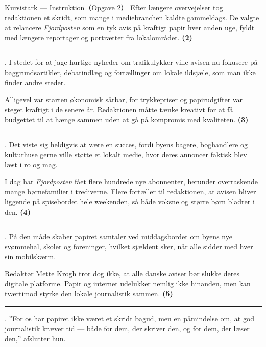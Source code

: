 \begin{emailbox}{Kursistark --- Instruktion（Opgave 2）}
\vspace{0.25em}
Efter længere overvejelser tog redaktionen et skridt, som mange i mediebranchen kaldte gammeldags. De valgte at relancere \textit{Fjordposten} som en tyk avis på kraftigt papir hver anden uge, fyldt med længere reportager og portrætter fra lokalområdet. \textbf{(2)}\ \rule{1.8cm}{0.4pt}. I stedet for at jage hurtige nyheder om trafikulykker ville avisen nu fokusere på baggrundsartikler, debatindlæg og fortællinger om lokale ildsjæle, som man ikke finder andre steder.

\vspace{0.25em}
Alligevel var starten økonomisk sårbar, for trykkepriser og papirudgifter var steget kraftigt i de senere år. Redaktionen måtte tænke kreativt for at få budgettet til at hænge sammen uden at gå på kompromis med kvaliteten. \textbf{(3)}\ \rule{1.8cm}{0.4pt}. Det viste sig heldigvis at være en succes, fordi byens bagere, boghandlere og kulturhuse gerne ville støtte et lokalt medie, hvor deres annoncer faktisk blev læst i ro og mag.

\vspace{0.25em}
I dag har \textit{Fjordposten} fået flere hundrede nye abonnenter, herunder overraskende mange børnefamilier i trediverne. Flere fortæller til redaktionen, at avisen bliver liggende på spisebordet hele weekenden, så både voksne og større børn bladrer i den. \textbf{(4)}\ \rule{1.8cm}{0.4pt}. På den måde skaber papiret samtaler ved middagsbordet om byens nye svømmehal, skoler og foreninger, hvilket sjældent sker, når alle sidder med hver sin mobilskærm.

\vspace{0.25em}
Redaktør Mette Krogh tror dog ikke, at alle danske aviser bør slukke deres digitale platforme. Papir og internet udelukker nemlig ikke hinanden, men kan tværtimod styrke den lokale journalistik sammen. \textbf{(5)}\ \rule{1.8cm}{0.4pt}. ''For os har papiret ikke været et skridt bagud, men en påmindelse om, at god journalistik kræver tid --- både for dem, der skriver den, og for dem, der læser den,'' afslutter hun.
\end{emailbox}

